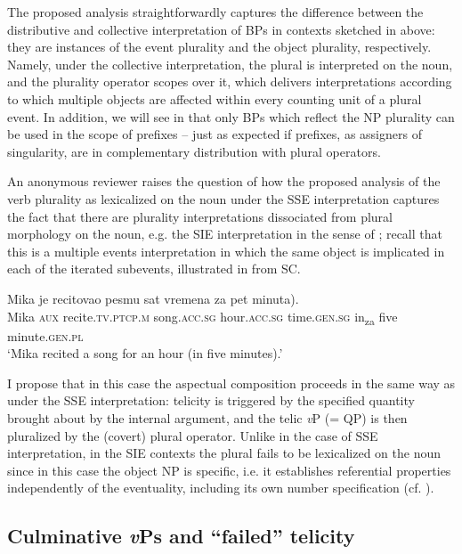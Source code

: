 \documentclass[output=paper,colorlinks,citecolor=brown]{langscibook}
\begin{document}
The proposed analysis straightforwardly captures the difference between the distributive and collective interpretation of BPs in contexts sketched in  above: they are instances of the event plurality and the object plurality, respectively. Namely, under the collective interpretation, the plural is interpreted on the noun, and the plurality operator scopes over it, which delivers interpretations according to which multiple objects are affected within every counting unit of a plural event. In addition, we will see in  that only BPs which reflect the NP plurality can be used in the scope of prefixes -- just as expected if prefixes, as assigners of singularity, are in complementary distribution with plural operators.

An anonymous reviewer raises the question of how the proposed analysis of the verb plurality as lexicalized on the noun under the SSE interpretation captures the fact that there are plurality interpretations dissociated from plural morphology on the noun, e.g. the SIE interpretation in the sense of \citet[41]{MacDonald_2008}; recall that this is a multiple events interpretation in which the same object is implicated in each of the iterated subevents, illustrated in  from SC.

\ea \label{mil:ex:SIE-SC-1}
\gll Mika   je  recitovao   pesmu   sat vremena \minsp{(} za pet minuta). \\
     Mika \textsc{aux} recite.\textsc{tv.ptcp.m} song.\textsc{acc.sg} hour.\textsc{acc.sg} time.\textsc{gen.sg} {} in\textsubscript{za} five minute.\textsc{gen.pl} \\
\glt `Mika recited a song for an hour (in five minutes).'
\z

\noindent I propose that in this case the aspectual composition proceeds in the same way as under the SSE interpretation: telicity is triggered by the specified quantity brought about by the internal argument, and the telic \textit{v}P (= QP) is then pluralized by the (covert) plural operator. Unlike in the case of SSE interpretation, in the SIE contexts the plural fails to be lexicalized on the noun since in this case the object NP is specific, i.e. it establishes referential properties independently of the eventuality, including its own number specification (cf. \citealt{Arsenijević2006eah}). 

\subsection{Culminative \textit{v}Ps and ``failed'' telicity} \label{mil:sec:CulminativePredicatesDurads}
\end{document}

